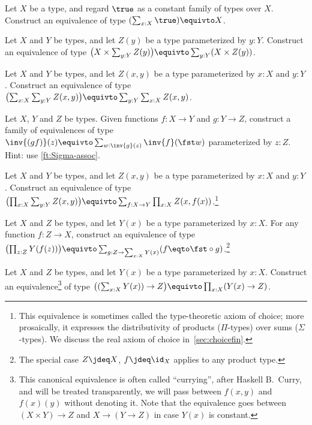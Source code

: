 \begin{xca}\label{xca:XequivXtimes1}
  Let $X$ be a type, and regard $\true$ as a constant family of types over $X$.
  Construct an equivalence of type $( \sum_{x:X} \true ) \equivto X $.
\end{xca}

\begin{xca}\label{xca:Sigma-distrib}
  Let $X$ and $Y$ be types, and let $Z(y)$ be a type parameterized by $y:Y$.
  Construct an equivalence of type
  $\bigl(X\times\sum_{y:Y}Z(y)\bigr) \equivto \sum_{y:Y}(X\times Z(y))$.
\end{xca}

\begin{xca}\label{xca:Sigma-comm}
  Let $X$ and $Y$ be types, and let $Z(x,y)$ be a type parameterized by
  $x:X$ and $y:Y$.
  Construct an equivalence of type $\bigl(\sum_{x:X}\sum_{y:Y}Z(x,y)\bigr)
  \equivto \sum_{y:Y}\sum_{x:X}Z(x,y)$.
\end{xca}

\begin{xca}\label{xca:fib-of-comp}
  Let $X$, $Y$ and $Z$ be types. Given functions $f: X\to Y$ and $g: Y\to Z$,
  construct a family of equivalences of type
  $\inv{(gf)}(z) \equivto \sum_{w:\inv{g}(z)}\inv{f}(\fst w)$ parameterized
  by $z:Z$. Hint: use \cref{ft:Sigma-assoc}.
\end{xca}

\begin{xca}\label{xca:AC-in-TT}
  Let $X$ and $Y$ be types, and let $Z(x,y)$ be a type parameterized by
  $x:X$ and $y:Y$.
  Construct an equivalence of type $\bigl(\prod_{x:X}\sum_{y:Y}Z(x,y)\bigr)
  \equivto \sum_{f:X\to Y}\prod_{x:X}Z(x,f(x))$.\footnote{%
    This equivalence is sometimes called the type-theoretic axiom of choice;
    more prosaically, it expresses the distributivity of products ($\Pi$-types)
    over sums ($\Sigma$-types).
    We discuss the real axiom of choice in~\cref{sec:choicefin}.}
\end{xca}

\begin{xca}\label{xca:section-above-f}
  Let $X$ and $Z$ be types, and let $Y(x)$ be a type parameterized by $x:X$.
  For any function $f:Z\to X$, construct an equivalence
  of type $\bigl(\prod_{z:Z}Y(f(z))\bigr)\equivto 
  \sum_{g:Z\to\sum_{x:X}Y(x)}(f\eqto \fst\circ g)$.\footnote{%
  The special case $Z\jdeq X$, $f\jdeq\id_X$ applies to any product type.}
\end{xca}

\begin{xca}\label{xca:Sigma-curry}
  Let $X$ and $Z$ be types, and let $Y(x)$ be a type parameterized by $x:X$.
  Construct an equivalence\footnote{%
  This canonical equivalence is often called ``currying'',
  after Haskell B.~Curry, and will be treated transparently, \ie
  we will pass between $f(x,y)$ and $f(x)(y)$ without denoting it.
  Note that the equivalence goes between
  $(X\times Y)\to Z$ and $X\to(Y\to Z)$ in case $Y(x)$ is constant.
  }
  of type $\bigl((\sum_{x:X}Y(x))\to Z\bigr)\equivto \prod_{x:X}(Y(x)\to Z)$.
\end{xca}

